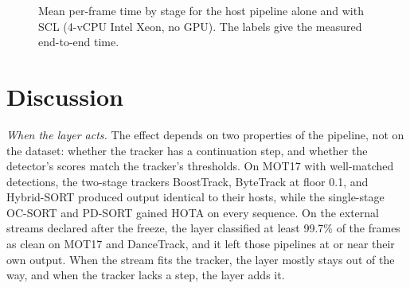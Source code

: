 \documentclass[pdflatex,sn-mathphys-num]{sn-jnl}
\newcommand{\scl}{SCL}
\begin{document}
\begin{figure}[t]
\centering
\caption{Mean per-frame time by stage for the host pipeline alone and with
\scl{} (4-vCPU Intel Xeon, no GPU). The labels give the measured
end-to-end time.}
\label{fig:runtime}
\end{figure}
\section{Discussion}\label{sec:discussion}

\emph{When the layer acts.} The effect depends on two properties of the
pipeline, not on the dataset: whether the tracker has a continuation step,
and whether the detector's scores match the tracker's thresholds. On MOT17
with well-matched detections, the two-stage trackers BoostTrack, ByteTrack at
floor 0.1, and Hybrid-SORT produced output identical to their hosts, while
the single-stage OC-SORT and PD-SORT gained HOTA on every sequence. On the
external streams declared after the freeze, the layer classified at least
99.7\% of the frames as clean on MOT17 and DanceTrack, and it left those
pipelines at or near their own output. When the stream fits the tracker, the
layer mostly stays out of the way, and when the tracker lacks a step, the
layer adds it.
\end{document}
